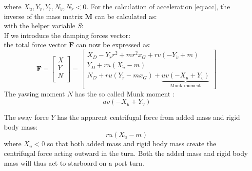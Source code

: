 \begin{equation}
    \label{eq:C_expanded}
    
\end{equation}
where $X_{\dot{u}},Y_{\dot{v}},Y_{\dot{r}},N_{\dot{v}},N_{\dot{r}} < 0$. 
For the calculation of acceleration \autoref{eq:acc}, the inverse of the mass matrix $\mathbf{M}$ can be calculated as:
\begin{equation}
    \label{eq:M_inv}
    
\end{equation}
with the helper variable $S$:
\begin{equation}
    \label{eq:S}
    
\end{equation}
If we introduce the damping forces vector:
\begin{equation}
    \label{eq:D}
    
\end{equation}
the total force vector $\mathbf{F}$ can now be expressed as:
\begin{equation}
    \label{eq:F_expanded}
\mathbf{F} = 
\left[\begin{matrix}
X \\
Y \\
N \\
\end{matrix}\right]
=
\left[\begin{matrix}X_{D} - Y_{\dot{r}} r^{2} + m r^{2} x_{G} + r v \left(- Y_{\dot{v}} + m\right)\\Y_{D} + r u \left(X_{\dot{u}} - m\right)\\N_{D} + r u \left(Y_{\dot{r}} - m x_{G}\right) + \underbrace{u v \left(- X_{\dot{u}} + Y_{\dot{v}}\right)}_{\text{Munk moment}} \end{matrix}\right]
\end{equation}
The yawing moment $N$ has the so called Munk moment \citep{fossenHandbookMarineCraft2011}:
$$
u v \left(- X_{\dot{u}} + Y_{\dot{v}}\right)
$$

The sway force $Y$ has the apparent centrifugal force from added mass and rigid body mass: 
$$r u \left(X_{\dot{u}} - m\right)$$ where $X_{\dot{u}}<0$ so that both added mass and rigid body mass create the centrifugal force acting outward in the turn. Both the added mass and rigid body mass will thus act to starboard on a port turn.
